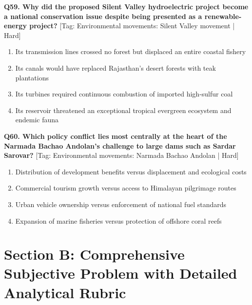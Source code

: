 \noindent\textbf{Q59. Why did the proposed Silent Valley hydroelectric project become a national conservation issue despite being presented as a renewable-energy project?} \hfill [Tag: Environmental movements: Silent Valley movement | Hard]
\begin{enumerate}[label=(\alph*),topsep=2pt,itemsep=1pt,partopsep=0pt,parsep=0pt]
    \item {Its transmission lines crossed no forest but displaced an entire coastal fishery}
    \item {Its canals would have replaced Rajasthan's desert forests with teak plantations}
    \item {Its turbines required continuous combustion of imported high-sulfur coal}
    \item {Its reservoir threatened an exceptional tropical evergreen ecosystem and endemic fauna}
\end{enumerate}
\vspace{2mm}

\noindent\textbf{Q60. Which policy conflict lies most centrally at the heart of the Narmada Bachao Andolan's challenge to large dams such as Sardar Sarovar?} \hfill [Tag: Environmental movements: Narmada Bachao Andolan | Hard]
\begin{enumerate}[label=(\alph*),topsep=2pt,itemsep=1pt,partopsep=0pt,parsep=0pt]
    \item {Distribution of development benefits versus displacement and ecological costs}
    \item {Commercial tourism growth versus access to Himalayan pilgrimage routes}
    \item {Urban vehicle ownership versus enforcement of national fuel standards}
    \item {Expansion of marine fisheries versus protection of offshore coral reefs}
\end{enumerate}
\vspace{2mm}


\section{Section B: Comprehensive Subjective Problem with Detailed Analytical Rubric}

